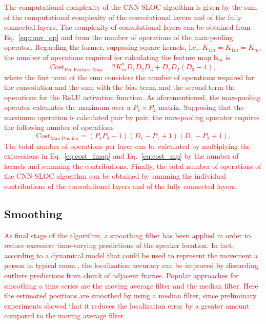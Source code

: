 \documentclass[review]{elsarticle}
\let\originaleqref=\eqref
\renewcommand{\eqref}{Eq.~\originaleqref}
\begin{document}
\textcolor{red}{The computational complexity of the CNN-SLOC algorithm is given by the sum of the computational complexity of the convolutional layers and of the fully connected layers. The complexity of convolutional layers can be obtained from \eqref{eq:conv_op} and from the number of operations of the max-pooling operator. Regarding the former, supposing square kernels, i.e., $K_{1m} = K_{1m} = K_m$, the number of operations required for calculating the feature map $\mathbf{h}_{m}$ is
\begin{equation}\label{eq:cost_fmap}
\text{Cost}_{\text{Per-Feature-Map}} =2K_m^2D_1D_2D_3+D_1D_2(D_3-1),
\end{equation}
where the first term of the sum considers the number of operations required for the convolution and the sum with the bias term, and the second term the operations for the ReLU activation function. As aforementioned, the max-pooling operator calculates the maximum over a $P_1 \times P_2 $ matrix. Supposing that the maximum operation is calculated pair by pair, the max-pooling operator requires the following number of operations
\begin{equation}\label{eq:cost_mp}
\text{Cost}_{\text{Max-Pooling}}=(P_1P_2-1)(D_1-P_1+1)(D_1-P_2+1).
\end{equation}
The total number of operations per layer can be calculated by multiplying the expressions in \eqref{eq:cost_fmap} and \eqref{eq:cost_mp} by the number of kernels and summing the contributions. Finally, the total number of operations of the CNN-SLOC algorithm can be obtained by summing the individual contributions of the convolutional layers and of the fully connected layers.}

\subsection{Smoothing}
\textcolor{red}{
As final stage of the algorithm, a smoothing filter has been applied in order to reduce excessive time-varying predictions of the speaker location. In fact, according to a dynamical model that could be used to represent the movement a person in typical room \cite{vermaak2001nonlinear}, the localization accuracy can be improved by discarding outliers predictions from chunk of adjacent frames. Popular approaches for smoothing a time series are the moving average filter and the median filter. Here the estimated positions are smoothed by using a median filter, since preliminary experiments showed that it reduces the localization error by a greater amount compared to the moving average filter.
}
\end{document}
